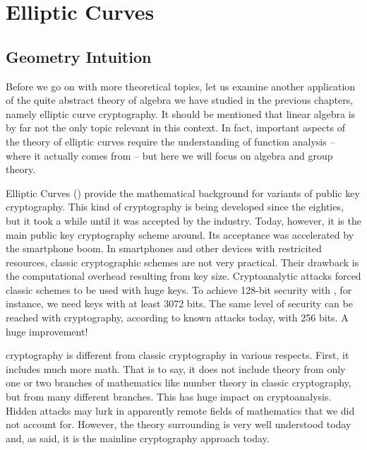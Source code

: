 \documentclass[tikz]{scrreprt}
\newcommand{\Conid}[1]{\mathit{#1}}
\def\resethooks{%
  \global\let\SaveRestoreHook\empty
  \global\let\ColumnHook\empty}
\let\hspre\empty
\let\hspost\empty
\begin{document}
\setlength{\parindent}{0pt}
\setlength{\parskip}{8pt}

\chapter{Elliptic Curves} %
\section{Geometry Intuition} 
\ignore{
\begingroup\par\noindent\advance\leftskip\mathindent\(
\begin{pboxed}\SaveRestoreHook
\column{B}{@{}>{\hspre}l<{\hspost}@{}}%
\column{E}{@{}>{\hspre}l<{\hspost}@{}}%
\>[B]{}\mathbf{module}\;\Conid{ECGeometry}{}\<[E]%
\\
\>[B]{}\mathbf{where}{}\<[E]%
\ColumnHook
\end{pboxed}
\)\par\noindent\endgroup\resethooks
}

Before we go on with more theoretical topics,
let us examine another application of the quite
abstract theory of algebra we have studied
in the previous chapters, namely 
elliptic curve cryptography. It should be
mentioned that linear algebra is by far 
not the only topic relevant in this context.
In fact, important aspects of the theory
of elliptic curves require the understanding
of function analysis -- where it actually
comes from -- but here we will focus on 
algebra and group theory.

Elliptic Curves () provide the mathematical
background for variants of public key cryptography.
This kind of cryptography is being developed
since the eighties, but it took a while until it
was accepted by the industry. 
Today, however, it is the 
main public key cryptography scheme around.
Its acceptance was accelerated by the smartphone boom.
In smartphones and other devices with restricited
resources, classic cryptographic schemes are not
very practical. Their drawback is
the computational overhead resulting from key size.
Cryptoanalytic attacks forced classic schemes
to be used with huge keys. To achieve 128-bit security 
with , for instance, we need keys with at least
\num{3072} bits. The same level of security
can be reached with  cryptography, 
according to known attacks today,
with 256 bits. A huge improvement!

 cryptography is different from
classic cryptography in various respects.
First, it includes much more math.
That is to say, it does not include 
theory from only one or two branches
of mathematics like number theory
in classic cryptography,
but from many different branches.
This has huge impact on cryptoanalysis.
Hidden attacks may lurk
in apparently remote fields of mathematics
that we did not account for.
However, the theory surrounding 
is very well understood today and, as said,
it is the mainline cryptography approach today.
\end{document}
